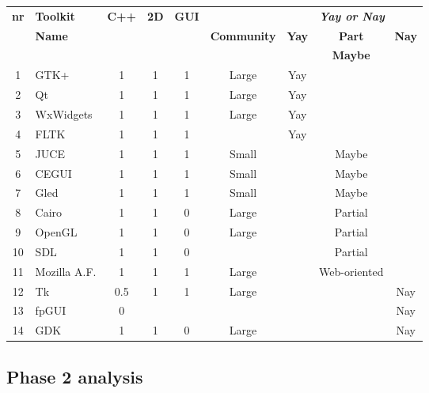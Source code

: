 \begin{center}
    \small\sf
    \begin{tabular}{c|lccc|c|ccc}
	\hline
	{\bf\sf nr} & {\bf\sf Toolkit} & {\bf\sf C++} & {\bf\sf 2D} & {\bf\sf GUI} &            & \multicolumn{3}{c}{\em\bf\sf Yay or Nay} \\
	         & {\bf\sf Name}    & 			 &          &            & {\bf\sf Community} 	& {\bf\sf Yay} & {\bf\sf Part} & {\bf\sf Nay} \\
	         &			     &         	 &          &            &         		&           & {\bf\sf Maybe}  &         \\
        \hline
1  &	GTK+		& 1   & 1 & 1 &  Large  & Yay &         &     \\
2  &	Qt	      	& 1   & 1 & 1 &  Large  & Yay &         &     \\
3  &	WxWidgets 	& 1   & 1 & 1 &  Large  & Yay &         &     \\
4  &	FLTK      	& 1   & 1 & 1 &         & Yay &         &     \\
\hline
5  &	JUCE      	& 1   & 1 & 1 &  Small  &     & Maybe   &     \\
6  &	CEGUI     	& 1   & 1 & 1 &  Small  &     & Maybe   &     \\
7  &	Gled		& 1   & 1 & 1 &  Small  &     & Maybe   &     \\
\hline
8  &	Cairo     	& 1   & 1 & 0 &  Large  &     & Partial &     \\
9  &	OpenGL 	  	& 1   & 1 & 0 &  Large  &     & Partial &     \\
10 &	SDL			& 1   & 1 & 0 &         &     & Partial &     \\\hline
11 &	Mozilla A.F.  	& 1   & 1 & 1 &  Large  &     & Web-oriented   &     \\\hline
12 &	Tk	        & 0.5 & 1 & 1 &  Large  &     &         & Nay \\
13 &	fpGUI     	& 0   &   &   &         &     &         & Nay \\
14 &	GDK       	& 1   & 1 & 0 &  Large  &     &         & Nay \\
\hline
    \end{tabular}
	\label{tab:compare-main-req}
\end{center}

\subsection{Phase 2 analysis}

